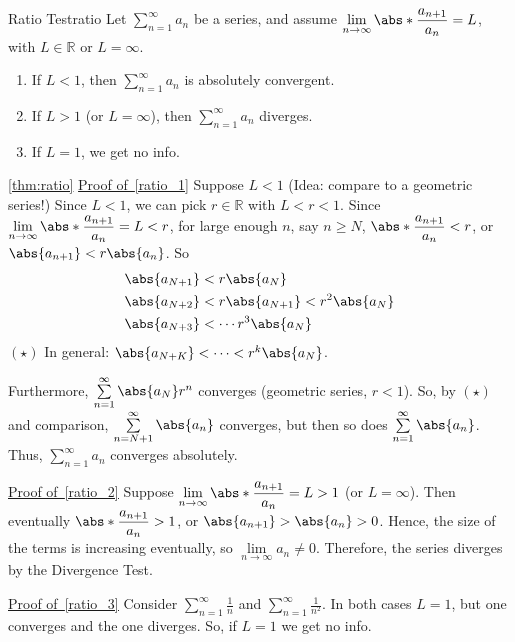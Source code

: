\begin{Theorem}{Ratio Test}{ratio}
    Let $ \sum\limits_{n=1}^{\infty} a_n $ be a series, and assume
    $ \displaystyle \lim\limits_{{n} \to {\infty}} \abs*{\frac{a_{n+1}}{a_n} }=L $,
    with $ L\in\mathbb{R} $ or $ L=\infty $.
    \begin{enumerate}[label=(\arabic*)]
        \item\label{ratio_1} If $ L<1 $, then $ \sum\limits_{n=1}^{\infty} a_n $ is absolutely convergent.
        \item\label{ratio_2} If $ L>1 $ (or $ L=\infty $), then $ \sum\limits_{n=1}^{\infty} a_n $
              diverges.
        \item\label{ratio_3} If $ L=1 $, we get no info.
    \end{enumerate}
\end{Theorem}
\begin{Proof}{\ref{thm:ratio}}{}
    \underline{Proof of~\ref{ratio_1}} Suppose $ L<1 $ (Idea: compare to a geometric series!)
    Since $ L<1 $, we can pick $ r\in\mathbb{R} $ with $ L<r<1 $. Since
    $ \displaystyle \lim\limits_{{n} \to {\infty}} \abs*{\dfrac{a_{n+1}}{a_n}}=L<r $,
    for large enough $ n $, say $ n\geqslant N $, $ \abs*{\dfrac{a_{n+1}}{a_n} }<r $,
    or $ \abs{a_{n+1}}<r\abs{a_n} $. So
    \begin{align*}
         & \abs{a_{N+1}}<r\abs{a_N}                  \\
         & \abs{a_{N+2}}<r\abs{a_{N+1}}<r^2\abs{a_N} \\
         & \abs{a_{N+3}}<\cdots r^3\abs{a_N}
    \end{align*}
    $ (\star) $ In general: $ \abs{a_{N+K}}<\cdots<r^k\abs{a_N} $.

    Furthermore, $ \sum\limits_{n=1}^{\infty} \abs{a_N}r^n $ converges (geometric series,
    $ r<1 $). So, by $ (\star) $ and comparison, $ \sum\limits_{n=N+1}^{\infty} \abs{a_n} $
    converges, but then so does $ \sum\limits_{n=1}^{\infty} \abs{a_n} $. Thus,
    $ \sum\limits_{n=1}^{\infty} a_n $ converges absolutely.

    \underline{Proof of~\ref{ratio_2}} Suppose $ \displaystyle \lim\limits_{{n} \to {\infty}} \abs*{\frac{a_{n+1}}{a_n} }=L>1 $
    (or $ L=\infty $). Then eventually $ \displaystyle \abs*{\frac{a_{n+1}}{a_n}}>1 $,
    or $ \abs{a_{n+1}}>\abs{a_n}>0 $. Hence, the size of the terms is increasing eventually,
    so $ \lim\limits_{{n} \to {\infty}} a_n\neq 0 $. Therefore, the
    series diverges by the Divergence Test.

    \underline{Proof of~\ref{ratio_3}} Consider
    $ \displaystyle \sum\limits_{n=1}^{\infty} \frac{1}{n} $ and
    $ \displaystyle \sum\limits_{n=1}^{\infty}
        \frac{1}{n^2}  $. In both cases $ L=1 $, but one converges and the one diverges. So,
    if $ L=1 $ we get no info.
\end{Proof}

